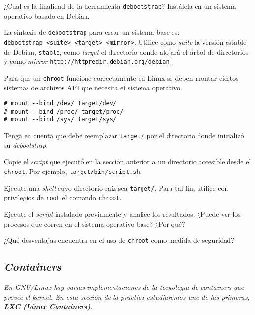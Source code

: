 \begin{questions}
  \question ¿Cuál es la finalidad de la herramienta \texttt{debootstrap}?
  Instálela en un sistema operativo basado en Debian.

  \question La sintaxis de \texttt{debootstrap} para crear un sistema base
  es: \texttt{debootstrap\ <suite>\ <target>\ <mirror>}. Utilice como
  \textit{suite} la versión estable de Debian, \texttt{stable}, como
  \textit{target} el directorio donde alojará el árbol de directorios y
  como \textit{mirror} \texttt{http://httpredir.debian.org/debian}.

  \question Para que un \texttt{chroot} funcione correctamente en Linux se
  deben montar ciertos sistemas de archivos API que necesita el sistema
  operativo.
\begin{verbatim}
# mount --bind /dev/ target/dev/
# mount --bind /proc/ target/proc/
# mount --bind /sys/ target/sys/
\end{verbatim}

  Tenga en cuenta que debe reemplazar \texttt{target/} por el directorio
  donde inicializó su \textit{debootstrap}.

  \question Copie el \textit{script} que ejecutó en la sección anterior a
  un directorio accesible desde el \texttt{chroot}. Por ejemplo,
  \texttt{target/bin/script.sh}.

  \question Ejecute una \textit{shell} cuyo directorio raíz sea
  \texttt{target/}. Para tal fin, utilice con privilegios de \texttt{root}
  el comando \texttt{chroot}.

  \question Ejecute el \textit{script} instalado previamente y analice los
  resultados. ¿Puede ver los procesos que corren en el sistema operativo
  base? ¿Por qué?

  \question ¿Qué desventajas encuentra en el uso de \texttt{chroot} como
  medida de seguridad?

\end{questions}

\subsection{\textit{Containers}}

\textit{En GNU/Linux hay varias implementaciones de la tecnología de
  containers que provee el kernel. En esta sección de la práctica
  estudiaremos una de las primeras, \textbf{LXC (Linux Containers)}.}

